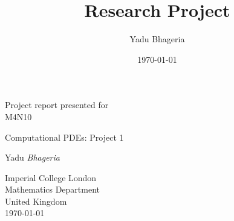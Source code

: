 \documentclass{article}
\title{Research Project}
\author{Yadu Bhageria}
\date{\today}
\begin{document}
\begin{titlepage}
    \begin{center}
    
        Project report presented for\\
        M4N10
        
        \vfill
        
        {\Huge Computational PDEs: Project 1}\\
        \vspace{0.5cm}
        
        {\LARGE Yadu \emph{Bhageria}}\\
        \vspace{0.5cm}
        
        \vfill
        
        Imperial College London\\
        Mathematics Department\\
        United Kingdom\\
        \today
        
    \end{center}
\end{titlepage}

\newpage
\end{document}
